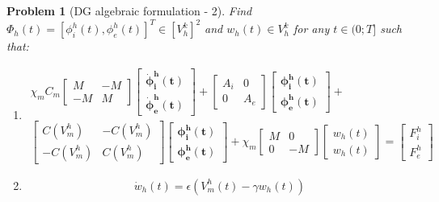 \documentclass[a4paper,11pt]{article}
\newtheorem{problem}{Problem}
\begin{document}
 \begin{problem}[DG algebraic formulation - 2] \label{block_matrix}
 Find $\Phi_h(t)=[\phi_i^h(t),\phi_e^h(t)]^T \in [V_h^k]^2$ and $w_h(t) \in V_h^k$ for any $t \in (0;T]$ such that:
 \begin{enumerate}[label=\Roman*]
 \item
 \begin{equation*}
 \begin{gathered}
 \chi_mC_m \begin{bmatrix}M &-M \\ -M & M \end{bmatrix}
	\begin{bmatrix}\bm{\dot{\phi}_i^h(t)} \\ \bm{\dot{\phi}_e^h(t)} \end{bmatrix}
	 + \begin{bmatrix}A_i & 0 \\ 0 & A_e \end{bmatrix}
	 \begin{bmatrix}\bm{\phi_i^h(t)} \\ \bm{\phi_e^h(t)} \end{bmatrix} +\\
	   \begin{bmatrix}C(V_m^h) & -C(V_m^h) \\ -C(V_m^h) & C(V_m^h) \end{bmatrix} 
	   \begin{bmatrix} \bm{\phi_i^h(t)} \\ \bm{\phi_e^h(t)}  \end{bmatrix} 
	   +\chi_m \begin{bmatrix}M & 0 \\ 0 & -M \end{bmatrix} 
	   	\begin{bmatrix}w_h(t) \\ w_h(t) \end{bmatrix} = 
	   	\begin{bmatrix} F_i^h \\ F_e^h\end{bmatrix}
 \end{gathered}
 \end{equation*}
 \item
 \begin{equation*}
	   \dot{w}_h(t)=\epsilon (V_m^h(t)-\gamma w_h(t))
\end{equation*}
\end{enumerate}
\end{problem}
\vspace{10mm}
\end{document}
